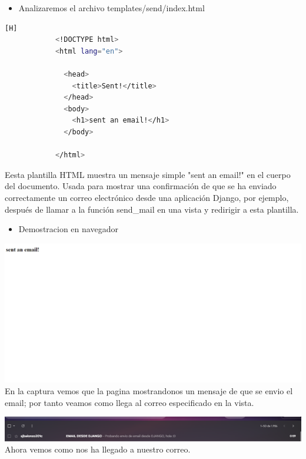 \documentclass{article}
\begin{document}
         \begin{itemize}
            \item Analizaremos el archivo templates/send/index.html
        \end{itemize}
        \begin{lstlisting}[language=bash,caption={Archivo send/templates/send/index.html}][H]
            <!DOCTYPE html>
            <html lang="en">
              
              <head>
                <title>Sent!</title>
              </head> 
              <body>
                <h1>sent an email!</h1>
              </body>
            
            </html>

	\end{lstlisting}
         Eesta plantilla HTML muestra un mensaje simple "sent an email!" en el cuerpo del documento. Usada para mostrar una confirmación de que se ha enviado correctamente un correo electrónico desde una aplicación Django, por ejemplo, después de llamar a la función send\_mail en una vista y redirigir a esta plantilla.\newline

        \begin{itemize}
            \item Demostracion en navegador\newline
            
        \end{itemize}
        \includegraphics[width=16cm]{img/INDEX EMAIL.png}
        \newline En la captura vemos que la pagina mostrandonos un mensaje de que se envio el email; por tanto veamos como llega al correo especificado en la vista.

        \includegraphics[width=16cm]{img/correo recibido.png}
        \newline Ahora vemos como nos ha llegado a nuestro correo.
\end{document}
